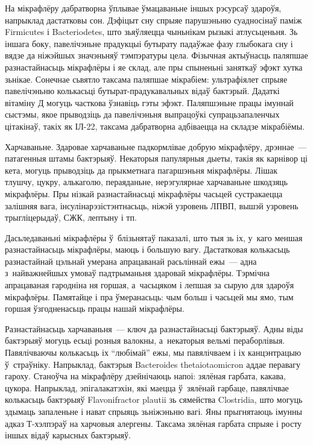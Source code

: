 На мікрафлёру дабратворна ўплывае ўмацаваньне іншых рэсурсаў здароўя, напрыклад дастатковы сон. Дэфіцыт сну спрыяе парушэньню суадносінаў паміж Firmicutes і Bacteriodetes, што зьяўляецца чыньнікам рызыкі атлусьценьня. Зь іншага боку, павелічэньне прадукцыі бутырату падаўжае фазу глыбокага сну і вядзе да ніжэйшых значэньняў тэмпэратуры цела. Фізычная актыўнасць паляпшае разнастайнасьць мікрафлёры і яе склад, але пры спыненьні заняткаў эфэкт хутка зьнікае. Сонечнае сьвятло таксама паляпшае мікрабіем: ультрафіялет спрыяе павелічэньню колькасьці бутырат-прадукавальных відаў бактэрый. Дадаткі вітаміну Д могуць часткова ўзнавіць гэты эфэкт. Паляпшэньне працы імуннай сыстэмы, якое прыводзіць да павелічэньня выпрацоўкі супрацьзапаленчых цітакінаў, такіх як ІЛ-22, таксама дабратворна адбіваецца на складзе мікрабіёмы.

Харчаваньне. Здаровае харчаваньне падкормлівае добрую мікрафлёру, дрэннае~--- патагенныя штамы бактэрыяў. Некаторыя папулярныя дыеты, такія як карнівор ці кета, могуць прыводзіць да прыкметнага пагаршэньня мікрафлёры. Лішак тлушчу, цукру, алькаголю, пераяданьне, нерэгулярнае харчаваньне шкодзяць мікрафлёры. Пры нізкай разнастайнасьці мікрафлёры часьцей сустракаецца залішняя вага, інсулінарэзістэнтнасьць, ніжэй узровень ЛПВП, вышэй узровень трыгліцерыдаў, СЖК, лептыну і тп.

Дасьледаваньні мікрафлёры ў~блізьнятаў паказалі, што тыя зь іх, у~каго меншая разнастайнасьць мікрафлёры, маюць і большую вагу. Дастатковая колькасьць разнастайнай цэльнай умерана апрацаванай расьліннай ежы~--- адна з~найважнейшых умоваў падтрыманьня здаровай мікрафлёры. Тэрмічна апрацаваная гародніна ня горшая, а~часьцяком і лепшая за сырую для здароўя мікрафлёры. Памятайце і пра ўмеранасьць: чым больш і часьцей мы ямо, тым горшая ўзгодненасьць працы нашай мікрафлёры.

Разнастайнасьць харчаваньня~--- ключ да разнастайнасьці бактэрыяў. Адны віды бактэрыяў могуць есьці розныя валокны, а~некаторыя вельмі пераборлівыя. Павялічваючы колькасьць іх ``любімай'' ежы, мы павялічваем і іх канцэнтрацыю ў~страўніку. Напрыклад, бактэрыя Bacteroides thetaiotaomicron аддае перавагу гароху. Станоўча на мікрафлёру дзейнічаюць напоі: зялёная гарбата, какава, цукора. Напрыклад, эпігалакатэхін, які маецца ў~зялёнай гарбаце, павялічвае колькасьць бактэрыяў Flavonifractor plautii зь сямейства Clostridia, што могуць здымаць запаленьне і нават спрыяць зьніжэньню вагі. Яны прыгнятаюць імунны адказ Т-хэлпэраў на харчовыя алергены. Таксама зялёная гарбата спрыяе і росту іншых відаў карысных бактэрыяў.

